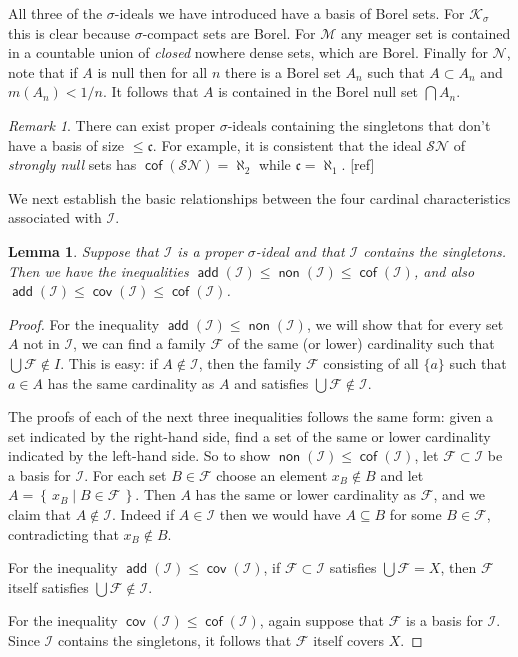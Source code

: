 \documentclass[11pt,oneside]{amsbook}
\newcommand{\set}[1]{\left\{\,#1\,\right\}}
\newcommand{\Null}{\mathcal N}
\newcommand{\Meager}{\mathcal M}
\newcommand{\Ksigma}{\mathcal K_\sigma}
\DeclareMathOperator{\add}{\mathsf{add}}
\DeclareMathOperator{\non}{\mathsf{non}}
\DeclareMathOperator{\cov}{\mathsf{cov}}
\DeclareMathOperator{\cof}{\mathsf{cof}}
\theoremstyle{definition}
\theoremstyle{plain}
\newtheorem{lem}[thm]{Lemma}
\theoremstyle{definition}
\theoremstyle{remark}
\newtheorem{rem}[thm]{Remark}
\begin{document}
All three of the $\sigma$-ideals we have introduced have a basis of Borel sets. For $\Ksigma$ this is clear because $\sigma$-compact sets are Borel. For $\Meager$ any meager set is contained in a countable union of \emph{closed} nowhere dense sets, which are Borel. Finally for $\Null$, note that if $A$ is null then for all $n$ there is a Borel set $A_n$ such that $A\subset A_n$ and $m(A_n)<1/n$. It follows that $A$ is contained in the Borel null set $\bigcap A_n$.

\begin{rem}
  There can exist proper $\sigma$-ideals containing the singletons that don't have a basis of size $\leq\mathfrak c$. For example, it is consistent that the ideal $\mathcal{SN}$ of \emph{strongly null} sets has $\cof(\mathcal{SN})=\aleph_2$ while $\mathfrak c=\aleph_1$. [ref] %
\end{rem}

We next establish the basic relationships between the four cardinal characteristics associated with $\mathcal I$.

\begin{lem}
  \label{lem:diamond}
  Suppose that $\mathcal I$ is a proper $\sigma$-ideal and that $\mathcal I$ contains the singletons. Then we have the inequalities $\add(\mathcal I)\leq\non(\mathcal I)\leq\cof(\mathcal I)$, and also $\add(\mathcal I)\leq\cov(\mathcal I)\leq\cof(\mathcal I)$.
\end{lem}

\begin{proof}
  For the inequality $\add(\mathcal{I})\leq\non(\mathcal{I})$, we will show that for every set $A$ not in $\mathcal I$, we can find a family $\mathcal F$ of the same (or lower) cardinality such that $\bigcup\mathcal F\notin I$. This is easy: if $A\notin\mathcal I$, then the family $\mathcal F$ consisting of all $\{a\}$ such that $a\in A$ has the same cardinality as $A$ and satisfies $\bigcup\mathcal F\notin\mathcal I$.

  The proofs of each of the next three inequalities follows the same form: given a set indicated by the right-hand side, find a set of the same or lower cardinality indicated by the left-hand side. So to show $\non(\mathcal I)\leq\cof(\mathcal I)$, let $\mathcal F\subset \mathcal{I}$ be a basis for $\mathcal I$. For each set $B\in\mathcal F$ choose an element $x_B\notin B$ and let $A=\set{x_B\mid B\in\mathcal F}$. Then $A$ has the same or lower cardinality as $\mathcal F$, and we claim that $A\notin\mathcal{I}$. Indeed if $A\in\mathcal{I}$ then we would have $A\subseteq B$ for some $B\in\mathcal F$, contradicting that $x_B\notin B$.

  For the inequality $\add(\mathcal I)\leq\cov(\mathcal I)$, if $\mathcal F\subset\mathcal{I}$ satisfies $\bigcup\mathcal F=X$, then $\mathcal F$ itself satisfies $\bigcup\mathcal F\notin\mathcal I$.

  For the inequality $\cov(\mathcal I)\leq\cof(\mathcal I)$, again suppose that $\mathcal F$ is a basis for $\mathcal I$. Since $\mathcal I$ contains the singletons, it follows that $\mathcal F$ itself covers $X$.
\end{proof}
\end{document}
